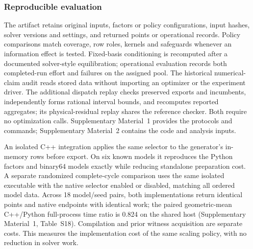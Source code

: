 \subsubsection{Reproducible evaluation}
The artifact retains original inputs, factors or policy configurations, input hashes,
solver versions and settings, and returned points or operational records. Policy comparisons
match coverage, row roles, kernels and safeguards whenever an information effect is tested.
Fixed-basis conditioning is recomputed after a documented solver-style equilibration;
operational evaluation records both completed-run effort and failures on the assigned pool.
The historical numerical-claim audit reads stored data without importing an optimizer or
the experiment driver. The additional dispatch replay checks preserved exports and
incumbents, independently forms rational interval bounds, and recomputes reported
aggregates; its physical-residual replay shares the reference checker. Both require no
optimization calls. Supplementary Material~1 provides the protocols and
commands; Supplementary Material~2 contains the code and analysis inputs.

An isolated C++ integration applies the same selector to the generator's in-memory
rows before export. On six known models it reproduces the Python factors and
binary64 models exactly while reducing standalone preparation cost.
A separate randomized complete-cycle comparison uses the same isolated executable
with the native selector enabled or disabled, matching all ordered model data.
Across 18 model/seed pairs, both implementations return identical points and native
endpoints with identical work; the paired geometric-mean C++/Python full-process
time ratio is 0.824 on the shared host (Supplementary Material~1, Table~S18).
Compilation and prior witness acquisition are separate costs. This measures the
implementation cost of the same scaling policy, with no reduction in solver work.
